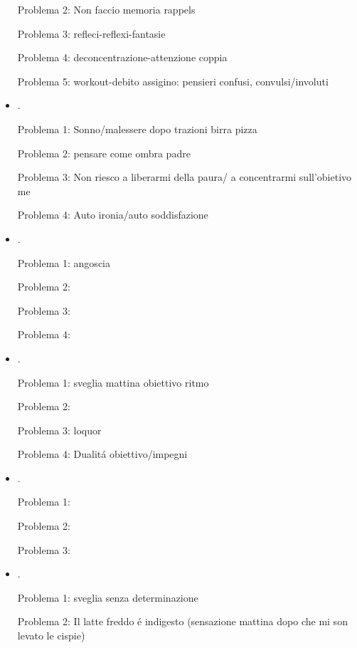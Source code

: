 \begin{itemize}
Problema 2: Non faccio memoria rappels

Problema 3: refleci-reflexi-fantasie

Problema 4: deconcentrazione-attenzione coppia

Problema 5: workout-debito assigino: pensieri confusi, convulsi/involuti


\item {}.

Problema 1: Sonno/malessere dopo trazioni birra pizza

Problema 2: pensare come ombra padre 

Problema 3: Non riesco a liberarmi della paura/ a concentrarmi sull'obietivo me

Problema 4: Auto ironia/auto soddisfazione

\item {}.

Problema 1: angoscia

Problema 2: 

Problema 3: 

Problema 4: 

\item {}.

Problema 1: sveglia mattina obiettivo ritmo

Problema 2: 

Problema 3: loquor

Problema 4: Dualit\'a obiettivo/impegni

\item {}.

Problema 1: 

Problema 2: 

Problema 3: 

\item {}.

Problema 1: sveglia senza determinazione

Problema 2: Il latte freddo \'e indigesto (sensazione mattina dopo che mi son levato le cispie)


\end{itemize}
